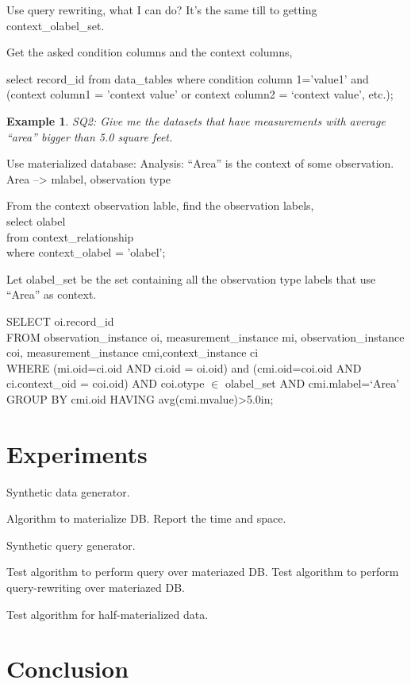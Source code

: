 \documentclass[conference]{IEEEtran}
\newtheorem{example}{Example}[section]
\begin{document}
Use query rewriting, what I can do? 
It's the same till to getting context\_olabel\_set. 

Get the asked condition columns and the context columns, 

select record\_id from data\_tables
where condition column 1='value1' and (context column1 = 'context
value' or context column2 = `context value', etc.);

\begin{example}
SQ2: Give me the datasets that have measurements with average ``area''
bigger than 5.0 square feet. 
\end{example}

Use materialized database: 
Analysis: ``Area'' is the context of some observation.
Area --> mlabel, observation type

From the context observation lable, find the observation labels, \\
select olabel\\
from context\_relationship\\
where context\_olabel = 'olabel'; 

Let olabel\_set  be the set containing all the observation type
labels that use ``Area'' as context. 

SELECT oi.record\_id \\
FROM observation\_instance oi, measurement\_instance mi, 
observation\_instance coi, measurement\_instance cmi,context\_instance ci\\
WHERE (mi.oid=ci.oid AND ci.oid = oi.oid) and (cmi.oid=coi.oid AND ci.context\_oid =
coi.oid) AND coi.otype $\in$ olabel\_set 
AND cmi.mlabel=`Area'
GROUP BY cmi.oid
HAVING avg(cmi.mvalue)>5.0in;


\section{Experiments}

Synthetic data generator. 

Algorithm to materialize DB. 
Report the time and space. 

Synthetic query generator. 

Test algorithm to perform query over materiazed DB.
Test algorithm to perform query-rewriting over materiazed DB.

Test algorithm for half-materialized data.

\section{Conclusion}




\end{document}

